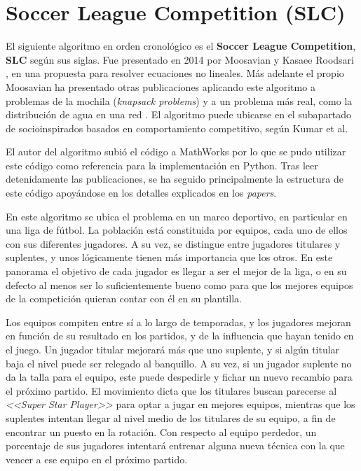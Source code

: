 \section{Soccer League Competition (SLC)}

El siguiente algoritmo en orden cronológico es el \textbf{Soccer League Competition}, \textbf{SLC} según sus siglas. Fue presentado en 2014 por Moosavian y Kasaee Roodsari \cite{slc-nonlinear-eq}, en una propuesta para resolver ecuaciones no lineales. Más adelante el propio Moosavian ha presentado otras publicaciones aplicando este algoritmo a problemas de la mochila (\textit{knapsack problems}) \cite{slc-knapsack} y a un problema más real, como la distribución de agua en una red \cite{slc-article}. El algoritmo puede ubicarse en el subapartado de socioinspirados basados en comportamiento competitivo, según Kumar et al. \cite{socio-evolution-algorithm}

El autor del algoritmo subió el código a MathWorks \cite{slc-matlab} por lo que se pudo utilizar este código como referencia para la implementación en Python. Tras leer detenidamente las publicaciones, se ha seguido principalmente la estructura de este código apoyándose en los detalles explicados en los \textit{papers}.

En este algoritmo se ubica el problema en un marco deportivo, en particular en una liga de fútbol. La población está constituida por equipos, cada uno de ellos con sus diferentes jugadores. A su vez, se distingue entre jugadores titulares y suplentes, y unos lógicamente tienen más importancia que los otros. En este panorama el objetivo de cada jugador es llegar a ser el mejor de la liga, o en su defecto al menos ser lo suficientemente bueno como para que los mejores equipos de la competición quieran contar con él en su plantilla.

Los equipos compiten entre sí a lo largo de temporadas, y los jugadores mejoran en función de su resultado en los partidos, y de la influencia que hayan tenido en el juego. Un jugador titular mejorará más que uno suplente, y si algún titular baja el nivel puede ser relegado al banquillo. A su vez, si un jugador suplente no da la talla para el equipo, este puede despedirle y fichar un nuevo recambio para el próximo partido. El movimiento dicta que los titulares buscan parecerse al \textit{<<Super Star Player>>} para optar a jugar en mejores equipos, mientras que los suplentes intentan llegar al nivel medio de los titulares de su equipo, a fin de encontrar un puesto en la rotación. Con respecto al equipo perdedor, un porcentaje de sus jugadores intentará entrenar alguna nueva técnica con la que vencer a ese equipo en el próximo partido.

